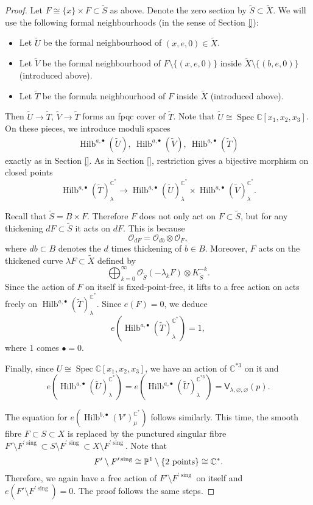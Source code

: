 \documentclass{amsart}
\theoremstyle{definition}
\newcommand{\CC} {\mathbb{C}}          %
\newcommand{\PP} {\mathbb{P}}
\renewcommand{\O}{\mathcal{O}}
\newcommand{\sfV}{\mathsf{V}}
\newcommand{\Hilb}{\operatorname{Hilb}}
\newcommand{\Spec}{\operatorname{Spec}}
\newcommand{\sing}{\operatorname{sing}}
\begin{document}
\begin{proof}
Let $F \cong \{x\} \times F \subset \tilde{S}$ as above. Denote the zero section by $\tilde{S} \subset \tilde{X}$. We will use the following formal neighbourhoods (in the sense of Section \ref{}): 
\begin{itemize}
\item Let $\tilde{U}$ be the formal neighbourhood of $(x,e,0) \in \tilde{X}$.
\item Let $\tilde{V}$ be the formal neighbourhood of $F \setminus \{(x,e,0)\}$ inside $\tilde{X} \setminus \{(b,e,0)\}$ (introduced above).
\item Let $\tilde{T}$ be the formula neighbourhood of $F$ inside $\tilde{X}$ (introduced above).
\end{itemize}
Then $\tilde{U} \rightarrow \tilde{T}$, $\tilde{V} \rightarrow \tilde{T}$ forms an fpqc cover of $\tilde{T}$. Note that $\tilde{U} \cong \Spec \CC[x_1,x_2,x_3]$. On these pieces, we introduce moduli spaces 
\begin{align*}
\Hilb^{a,\bullet}(\tilde{U}), \ \Hilb^{a,\bullet}(\tilde{V}), \ \Hilb^{a,\bullet}(\tilde{T})
\end{align*}
exactly as in Section \ref{}. As in Section \ref{}, restriction gives a bijective morphism on closed points
$$
\Hilb^{a,\bullet}(\tilde{T})^{\CC^*}_{\lambda} \rightarrow \Hilb^{a,\bullet}(\tilde{U})^{\CC^*}_{\lambda} \times \Hilb^{a,\bullet}(\tilde{V})^{\CC^*}_{\lambda}.
$$

Recall that $\tilde{S} = B \times F$. Therefore $F$ does not only act on $F \subset \tilde{S}$, but for any thickening $d F \subset \tilde{S}$ it acts on $d F$. This is because
$$
\O_{dF} = \O_{db} \otimes \O_F,
$$
where $db \subset B$ denotes the $d$ times thickening of $b \in B$. Moreover, $F$ acts on the thickened curve $\lambda F \subset \tilde{X}$ defined by
$$
\bigoplus_{k=0}^{\infty} \O_{\tilde{S}}(-\lambda_k F) \otimes K_{\tilde{S}}^{-k}.
$$
Since the action of $F$ on itself is fixed-point-free, it lifts to a free action on acts freely on $\Hilb^{a,\bullet}(\tilde{T})^{\CC^*}_{\lambda}$. Since $e(F)=0$, we deduce
$$
e(\Hilb^{a,\bullet}(\tilde{T})^{\CC^*}_{\lambda}) = 1,
$$ 
where 1 comes $\bullet = 0$.

Finally, since $U \cong \Spec \CC[x_1,x_2,x_3]$, we have an action of $\CC^{*3}$ on it and 
$$
e(\Hilb^{a,\bullet}(\tilde{U})^{\CC^*}_{\lambda}) = e(\Hilb^{a,\bullet}(\tilde{U})^{\CC^{*3}}_{\lambda}) = \sfV_{\lambda,\varnothing,\varnothing}(p).
$$

The equation for $e(\Hilb^{b,\bullet}(V')_{\mu}^{\CC^*})$ follows similarly. This time, the smooth fibre $F \subset S \subset X$ is replaced by the punctured singular fibre $F' \setminus F^{\prime \sing} \subset S \setminus F^{\prime \sing} \subset X \setminus F^{\prime \sing}$. Note that
$$
F' \setminus F^{\prime \sing} \cong \PP^1 \setminus \{2 \ \rm{points}\} \cong \CC^*.
$$
Therefore, we again have a free action of $F' \setminus F^{\prime \sing}$ on itself and $e(F' \setminus F^{\prime \sing}) = 0$. The proof follows the same steps.
\end{proof}   
\end{document}
